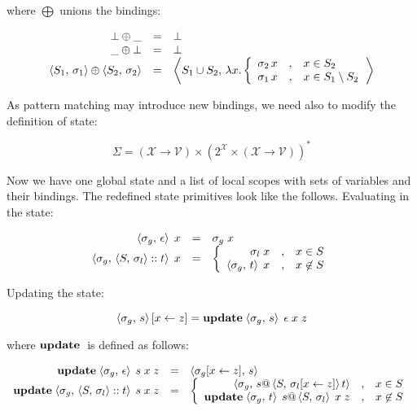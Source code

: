 where $\bigoplus$ unions the bindings:

\[
\begin{array}{rcl}
  \bot \oplus \_ & = & \bot \\
  \_ \oplus \bot & = & \bot \\
  \left<{S_1,\,\sigma_1}\right> \oplus \left<{S_2,\,\sigma_2}\right> & = & \left<{S_1\cup S_2,\,\lambda x . \left\{
                                     \begin{array}{rcl}
                                       \sigma_2\, x &,& x\in S_2\\
                                       \sigma_1\, x &,& x\in S_1\setminus S_2
                                     \end{array}
                                   \right.}\right>
\end{array}
\]

As pattern matching may introduce new bindings, we need also to modify the definition of state:

\[
\Sigma=(\mathscr X\to \mathscr V) \times (2^{\mathscr X} \times (\mathscr X\to \mathscr V))^*
\]


Now we have one global state and a list of local scopes with sets of variables and their bindings. The redefined state primitives
look like the follows. Evaluating in the state:


\[
\begin{array}{rcl}
  \left<{\sigma_g,\,\epsilon}\right>\;x&=&\sigma_g\;x\\
  \left<{\sigma_g,\,\left<{S,\,\sigma_l}\right>::t}\right>\;x&=&
     \left\{\begin{array}{rcl}
              \sigma_l\;x & , & x\in S\\
              \left<{\sigma_g,\,t}\right>\;x & , & x\not\in S
           \end{array}
     \right.
\end{array}
\]

Updating the state:

\[
 \left<{\sigma_g,\,s}\right>[x\gets z]=\mathbf{update}\;{\left<{\sigma_g,\,s}\right>\;\epsilon\;x\;z}
\]

where $\mathbf{update}\;{}$ is defined as follows:

\[
\begin{array}{rcl}
  \primi{update}{\inbr{\sigma_g,\,\epsilon}\;s\;x\;z}&=&\inbr{\sigma_g[x\gets z],\,s}\\
  \primi{update}{\inbr{\sigma_g,\,\inbr{S,\,\sigma_l}::t}\;s\;x\;z}&=&\left\{
     \begin{array}{rcl}
       \inbr{\sigma_g,\,s\llang{@}\inbr{S,\,\sigma_l[x\gets z]}t} &,&x\in S\\
       \primi{update}{\inbr{\sigma_g,\,t}\;s\llang{@}\inbr{S,\,\sigma_l}\;x\;z} &,&x\not\in S
     \end{array}\right.
\end{array}
\]

